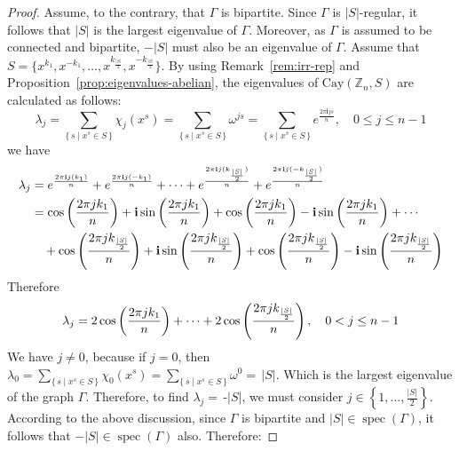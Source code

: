 \documentclass[12pt]{article}
\def\sin{{\rm{sin}}}
\def\cos{{\rm{cos}}}
\begin{document}
\begin{proof}
	Assume, to the contrary, that $\Gamma$ is bipartite. Since $\Gamma$ is $|S|$-regular, it follows that $|S|$ is the largest eigenvalue of $\Gamma$. Moreover, as $\Gamma$ is assumed to be connected and bipartite, $-|S|$ must also be an eigenvalue of $\Gamma$. Assume that $S = \{x^{k_1}, x^{-k_1}, \dots, x^{k_{\frac{|S|}{2}}}, x^{-k_{\frac{|S|}{2}}}\}$. By using Remark~\ref{rem:irr-rep} and Proposition~\ref{prop:eigenvalues-abelian}, the eigenvalues of $\mathrm{Cay}(\mathbb{Z}_n,S)$ are calculated as follows:
	\[
	\lambda_j = \sum\limits_{\{\, s \mid x^s \in S \,\}} \chi_j(x^s)
	= \sum\limits_{\{\, s \mid x^s \in S \,\}} \omega^{js}
	= \sum\limits_{\{\, s \mid x^s \in S \,\}} e^{\frac{2 \pi \mathbf{i} j s}{n}}, \quad 0 \le j \le n-1
	\]
	we have
\[
\begin{aligned}
	\lambda_j &=
	e^{\frac{2 \pi \mathbf{i} j (k_1)}{n}}
	+ e^{\frac{2 \pi \mathbf{i} j (-k_1)}{n}}
	+ \cdots
	+ e^{\frac{2 \pi \mathbf{i} j (k_{\frac{|S|}{2}})}{n}}
	+ e^{\frac{2 \pi \mathbf{i} j (-k_{\frac{|S|}{2}})}{n}} \\
	&=
	\cos\left(\frac{2 \pi j k_1}{n}\right)
	+ \mathbf{i}\,\sin\left(\frac{2 \pi j k_1}{n}\right)
	+ \cos\left(\frac{2 \pi j k_1}{n}\right)
	- \mathbf{i}\,\sin\left(\frac{2 \pi j k_1}{n}\right)
	+ \cdots \\
	&\quad + \cos\left(\frac{2 \pi j k_{\frac{|S|}{2}}}{n}\right)
	+ \mathbf{i}\,\sin\left(\frac{2 \pi j k_{\frac{|S|}{2}}}{n}\right)
	+ \cos\left(\frac{2 \pi j k_{\frac{|S|}{2}}}{n}\right)
	- \mathbf{i}\,\sin\left(\frac{2 \pi j k_{\frac{|S|}{2}}}{n}\right)
\end{aligned}
\]	
	Therefore
\[
\lambda_j = 2\,\cos\left(\frac{2 \pi j k_1}{n}\right)
+ \cdots
+ 2\,\cos\left(\frac{2 \pi j k_{\frac{|S|}{2}}}{n}\right), \quad 0 < j \le n-1
\]	
We have $j \neq 0$, because if $j = 0$, then $\lambda_0 =  \sum\limits_{\{\, s \mid x^s \in S \,\}} \chi_0(x^s) = \sum\limits_{\{\, s \mid x^s \in S \,\}} \omega^0 = \, |S|$. Which is the largest eigenvalue of the graph $\Gamma$. Therefore, to find
$\lambda_j =\,$-$|S|$, we must consider $j \in \left\{ 1, \dots, \frac{|S|}{2} \right\}$.
According to the above discussion, since $\Gamma$ is bipartite and
$|S| \in \operatorname{spec}(\Gamma)$, it follows that $-|S| \in \operatorname{spec}(\Gamma)$ also.
Therefore:


\end{proof}
\end{document}

